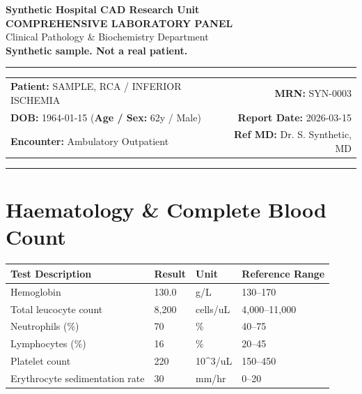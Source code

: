 \documentclass[10pt,a4paper]{article}
\begin{document}
\begin{center}
  {\Large \textbf{Synthetic Hospital CAD Research Unit}}\\
  \vspace{2pt}
  {\normalsize \textbf{COMPREHENSIVE LABORATORY PANEL}}\\
  \vspace{1pt}
  {\footnotesize \textcolor{subtext}{Clinical Pathology \& Biochemistry Department}}\\
  \vspace{4pt}
  {\small \textbf{\textcolor{red!75!black}{Synthetic sample. Not a real patient.}}}\\
  \vspace{3pt}
  \textcolor{linecolor}{\rule{\textwidth}{0.8pt}}
\end{center}

\vspace{2pt}

\noindent
\begin{tabular*}{\textwidth}{@{} l @{\extracolsep{\fill}} r @{}}
  \textbf{Patient:} SAMPLE, RCA / INFERIOR ISCHEMIA & \textbf{MRN:} SYN-0003 \\
  \textbf{DOB:} 1964-01-15 \quad (\textbf{Age / Sex:} 62y / Male) & \textbf{Report Date:} 2026-03-15 \\
  \textbf{Encounter:} Ambulatory Outpatient & \textbf{Ref MD:} Dr. S. Synthetic, MD \\
\end{tabular*}

\vspace{2pt}
\noindent\textcolor{linecolor}{\rule{\textwidth}{0.4pt}}
\vspace{6pt}


\section*{Haematology \& Complete Blood Count}

\begin{tabular}{@{} p{6.4cm} p{2.5cm} p{2.5cm} p{3.1cm} @{}}
  \toprule
  \textbf{Test Description} & \textbf{Result} & \textbf{Unit} & \textbf{Reference Range} \\
  \midrule
  Hemoglobin & 130.0 & g/L & 130--170 \\
  Total leucocyte count & 8,200 & cells/uL & 4,000--11,000 \\
  Neutrophils (\%) & 70 & \% & 40--75 \\
  Lymphocytes (\%) & 16 & \% & 20--45 \\
  Platelet count & 220 & 10\textasciicircum 3/uL & 150--450 \\
  Erythrocyte sedimentation rate & 30 & mm/hr & 0--20 \\
  \bottomrule
\end{tabular}
\end{document}
